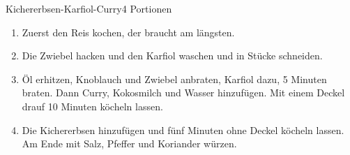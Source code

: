 \documentclass{article}
\begin{document}
\begin{recipe}{Kichererbsen-Karfiol-Curry}{4 Portionen}{}
\begin{enumerate}
  \item Zuerst den Reis kochen, der braucht am längsten.
  \item Die Zwiebel hacken und den Karfiol waschen und in Stücke schneiden.
  \item Öl erhitzen, Knoblauch und Zwiebel anbraten, Karfiol dazu, 5 Minuten braten. Dann Curry, Kokosmilch und Wasser hinzufügen. Mit einem Deckel drauf 10 Minuten köcheln lassen.
  \item Die Kichererbsen hinzufügen und fünf Minuten ohne Deckel köcheln lassen. Am Ende mit Salz, Pfeffer und Koriander würzen.

\end{enumerate}
\end{recipe}
\end{document}
